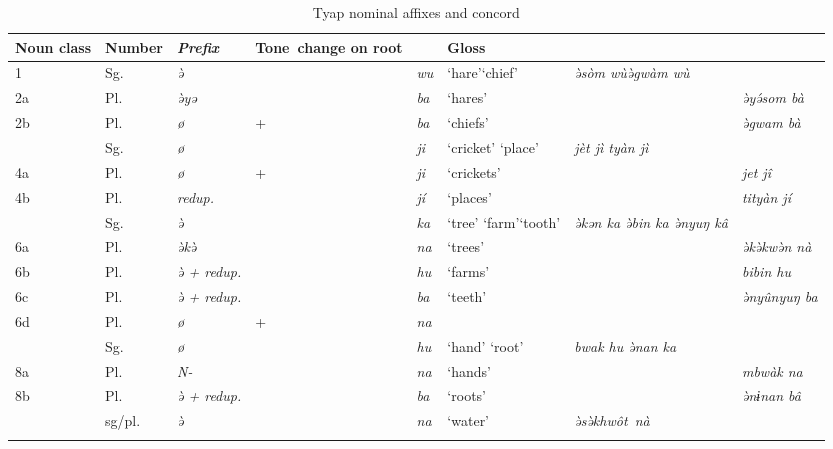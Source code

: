 \documentclass[output=paper]{langsci/langscibook}
\begin{document}
\begin{table}
\footnotesize
\caption{\label{tab:nomaffplat:6} Tyap nominal affixes and concord  \citep[72]{Follingstad1991}}
\begin{tabularx}{\textwidth}{p{0.5cm}p{1cm}@{~}>{\itshape}l@{}p{1.8cm}@{}>{\itshape}p{1.5cm} Q>{\itshape}p{1.8cm}@{}>{\itshape}l}
\lsptoprule
Noun class 	& Number 	& \upshape Prefix 	&  \raggedright Tone~change on root	&  	&  Gloss 	&  	& \\
 	& Sg.  	& ə̀ 	&  	& wu 	& ‘hare’\newline ‘chief’ 	& ə̀sòm  wù\newline ə̀gwàm wù  \\
\tablevspace
2a 	& Pl.  	& ə̀yə 	&  	& ba 	& ‘hares’ 	&  	& ə̀yə́som bà\\
2b 	& Pl.  	& ø 	& + 	& ba 	& ‘chiefs’ 	&  	& ə̀gwam bà\\
 	& Sg.  	& ø 	&  	& ji 	& ‘cricket’\newline
									‘place’ 	& jèt jì\newline
                                    			  tyàn jì  \\
\tablevspace
4a 	& Pl.  	& ø 	& + & ji 	& ‘crickets’ 	&  	& jet jî  \\
4b 	& Pl.  	& redup.&  	& jí 	& ‘places’ 	&  	& tityàn jí\\
 	& Sg.  	& ə̀ 	&  	& ka 	& ‘tree’\newline
									‘farm’\newline ‘tooth’ 	& ə̀kən ka\newline 
                                    							ə̀bin ka\newline
                                                                ə̀nyuŋ kâ 	 \\
\tablevspace
6a 	& Pl.  	& ə̀kə̀ 	&  	& na 	& ‘trees’ 	&  	& ə̀kə̀kwə̀n nà\\
6b 	& Pl.  	& ə̀ + redup. 	&  	& hu 	& ‘farms’ 	&  	&bibin hu\\
6c 	& Pl.  	& ə̀ + redup. 	&  	& ba 	& ‘teeth’ 	&  	& ə̀nyûnyuŋ ba\\
6d  	& Pl.    & ø             & + 	& na\\
 	& Sg.  	& ø 	        &  	& hu 	& ‘hand’\newline 
											‘root’ 	& bwak hu\newline 
													  ə̀nan ka\\
\tablevspace
8a 	& Pl.  	& N- 	&  	& na 	& ‘hands’ 	&  	& mbwàk na\\
8b 	& Pl.  	& ə̀ + redup. 	&  	& ba 	& ‘roots’ 	&  	& ə̀nɨnan bâ\\
 	& sg/pl. & ə̀ 	&  	& na 	& ‘water’ 	& \mbox{ə̀sə̀khwôt~nà}  \\
\lspbottomrule 
\end{tabularx}
\end{table}
\end{document}
